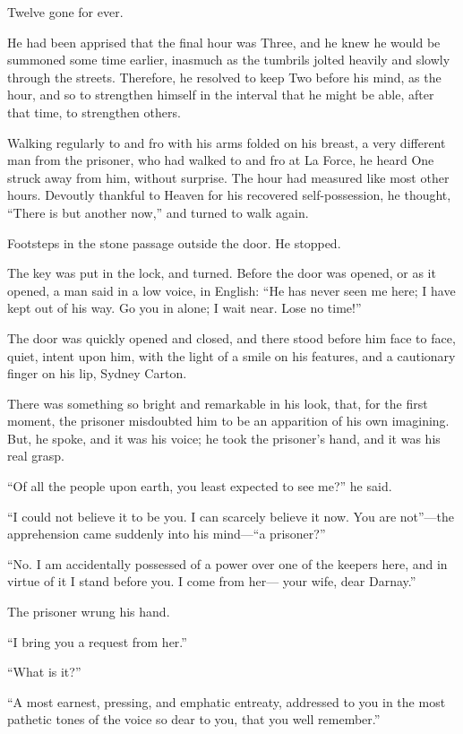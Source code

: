 Twelve gone for ever.

He had been apprised that the final hour was Three, and he knew he
would be summoned some time earlier, inasmuch as the tumbrils jolted
heavily and slowly through the streets.  Therefore, he resolved to keep
Two before his mind, as the hour, and so to strengthen himself in the
interval that he might be able, after that time, to strengthen others.

Walking regularly to and fro with his arms folded on his breast,
a very different man from the prisoner, who had walked to and fro at
La Force, he heard One struck away from him, without surprise.
The hour had measured like most other hours.  Devoutly thankful to
Heaven for his recovered self-possession, he thought, ``There is but
another now,'' and turned to walk again.

Footsteps in the stone passage outside the door.  He stopped.

The key was put in the lock, and turned.  Before the door was opened,
or as it opened, a man said in a low voice, in English:  ``He has never
seen me here; I have kept out of his way.  Go you in alone; I wait near.
Lose no time!''

The door was quickly opened and closed, and there stood before him
face to face, quiet, intent upon him, with the light of a smile on
his features, and a cautionary finger on his lip, Sydney Carton.

There was something so bright and remarkable in his look, that, for
the first moment, the prisoner misdoubted him to be an apparition of
his own imagining.  But, he spoke, and it was his voice; he took the
prisoner's hand, and it was his real grasp.

``Of all the people upon earth, you least expected to see me?'' he said.

``I could not believe it to be you.  I can scarcely believe it now.
You are not''---the apprehension came suddenly into his mind---``a prisoner?''

``No.  I am accidentally possessed of a power over one of the keepers
here, and in virtue of it I stand before you.  I come from her---%
your wife, dear Darnay.''

The prisoner wrung his hand.

``I bring you a request from her.''

``What is it?''

``A most earnest, pressing, and emphatic entreaty, addressed to you in
the most pathetic tones of the voice so dear to you, that you well remember.''


